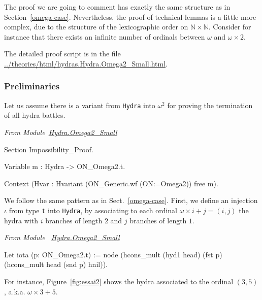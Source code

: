 The proof we are going to comment has exactly the same structure as in Section~\ref{omega-case}.
 Nevertheless, the proof of technical  lemmas is a little more complex, due to 
 the structure of the lexicographic order on $\mathbb{N}\times\mathbb{N}$. 
Consider for instance that there exists an infinite number of ordinals  between
$\omega$ and $\omega\times 2$.



The detailed  proof script is in the file \url{../theories/html/hydras.Hydra.Omega2_Small.html}.

\subsubsection{Preliminaries}
Let us assume there is a variant from \texttt{Hydra} into $\omega^2$  for proving the   termination of all hydra battles.

\vspace{4pt}
\emph{From Module~\href{../theories/html/hydras.Hydra.Omega2_Small.html}{Hydra.Omega2\_Small}}


\begin{Coqsrc}
Section Impossibility_Proof.
  
 Variable m : Hydra -> ON_Omega2.t.
  
 Context (Hvar : Hvariant (ON_Generic.wf (ON:=Omega2))  free m).
\end{Coqsrc}


We  follow the same pattern as in Sect.~\ref{omega-case}.
First, we define an injection $\iota$ from type \texttt{t} into \texttt{Hydra}, by
 associating to  each ordinal $\omega\times i+ j = (i,j)$ the hydra with $i$ branches of length $2$ and
$j$ branches of length $1$.


\vspace{4pt}
\emph{From Module ~\href{../theories/html/hydras.Hydra.Omega2_Small.html\#iota}{Hydra.Omega2\_Small}}

\begin{Coqsrc}
 Let iota (p: ON_Omega2.t) := 
     node (hcons_mult (hyd1 head) (fst p)
                    (hcons_mult head (snd p) hnil)).
\end{Coqsrc}

For instance, Figure~\vref{fig:essai2} shows the hydra associated to the ordinal 
$(3,5)$, a.k.a. $\omega\times 3 + 5$.

